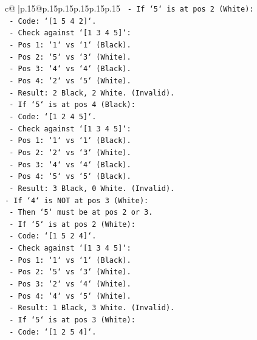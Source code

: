 \documentclass{article}
\begin{document}
{\begin{supertabular}{c@{$\;$}|p{.15\linewidth}@{}p{.15\linewidth}p{.15\linewidth}p{.15\linewidth}p{.15\linewidth}p{.15\linewidth}}
{{{\texttt{    {-} If `5` is at pos 2 (White):} \\
\texttt{        {-} Code: `{[}1 5 4 2{]}`.} \\
\texttt{        {-} Check against `{[}1 3 4 5{]}`:} \\
\texttt{            {-} Pos 1: `1` vs `1` (Black).} \\
\texttt{            {-} Pos 2: `5` vs `3` (White).} \\
\texttt{            {-} Pos 3: `4` vs `4` (Black).} \\
\texttt{            {-} Pos 4: `2` vs `5` (White).} \\
\texttt{            {-} Result: 2 Black, 2 White. (Invalid).} \\
\texttt{    {-} If `5` is at pos 4 (Black):} \\
\texttt{        {-} Code: `{[}1 2 4 5{]}`.} \\
\texttt{        {-} Check against `{[}1 3 4 5{]}`:} \\
\texttt{            {-} Pos 1: `1` vs `1` (Black).} \\
\texttt{            {-} Pos 2: `2` vs `3` (White).} \\
\texttt{            {-} Pos 3: `4` vs `4` (Black).} \\
\texttt{            {-} Pos 4: `5` vs `5` (Black).} \\
\texttt{            {-} Result: 3 Black, 0 White. (Invalid).} \\
\texttt{{-} If `4` is NOT at pos 3 (White):} \\
\texttt{    {-} Then `5` must be at pos 2 or 3.} \\
\texttt{    {-} If `5` is at pos 2 (White):} \\
\texttt{        {-} Code: `{[}1 5 2 4{]}`.} \\
\texttt{        {-} Check against `{[}1 3 4 5{]}`:} \\
\texttt{            {-} Pos 1: `1` vs `1` (Black).} \\
\texttt{            {-} Pos 2: `5` vs `3` (White).} \\
\texttt{            {-} Pos 3: `2` vs `4` (White).} \\
\texttt{            {-} Pos 4: `4` vs `5` (White).} \\
\texttt{            {-} Result: 1 Black, 3 White. (Invalid).} \\
\texttt{    {-} If `5` is at pos 3 (White):} \\
\texttt{        {-} Code: `{[}1 2 5 4{]}`.} \\
}}}
\end{supertabular}}
\end{document}
